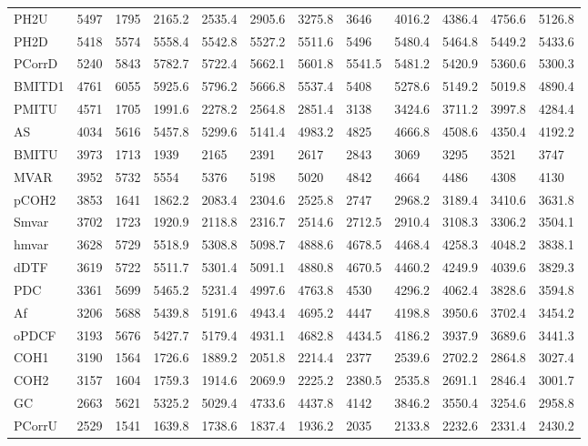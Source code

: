 \begin{table}[ht]
\begin{tabular}{llllllllllll}
  PH2U & 5497 & 1795 & 2165.2 & 2535.4 & 2905.6 & 3275.8 & 3646 & 4016.2 & 4386.4 & 4756.6 & 5126.8 \\ 
  PH2D & 5418 & 5574 & 5558.4 & 5542.8 & 5527.2 & 5511.6 & 5496 & 5480.4 & 5464.8 & 5449.2 & 5433.6 \\ 
  PCorrD & 5240 & 5843 & 5782.7 & 5722.4 & 5662.1 & 5601.8 & 5541.5 & 5481.2 & 5420.9 & 5360.6 & 5300.3 \\ 
  BMITD1 & 4761 & 6055 & 5925.6 & 5796.2 & 5666.8 & 5537.4 & 5408 & 5278.6 & 5149.2 & 5019.8 & 4890.4 \\ 
  PMITU & 4571 & 1705 & 1991.6 & 2278.2 & 2564.8 & 2851.4 & 3138 & 3424.6 & 3711.2 & 3997.8 & 4284.4 \\ 
  AS & 4034 & 5616 & 5457.8 & 5299.6 & 5141.4 & 4983.2 & 4825 & 4666.8 & 4508.6 & 4350.4 & 4192.2 \\ 
  BMITU & 3973 & 1713 & 1939 & 2165 & 2391 & 2617 & 2843 & 3069 & 3295 & 3521 & 3747 \\ 
  MVAR & 3952 & 5732 & 5554 & 5376 & 5198 & 5020 & 4842 & 4664 & 4486 & 4308 & 4130 \\ 
  pCOH2 & 3853 & 1641 & 1862.2 & 2083.4 & 2304.6 & 2525.8 & 2747 & 2968.2 & 3189.4 & 3410.6 & 3631.8 \\ 
  Smvar & 3702 & 1723 & 1920.9 & 2118.8 & 2316.7 & 2514.6 & 2712.5 & 2910.4 & 3108.3 & 3306.2 & 3504.1 \\ 
  hmvar & 3628 & 5729 & 5518.9 & 5308.8 & 5098.7 & 4888.6 & 4678.5 & 4468.4 & 4258.3 & 4048.2 & 3838.1 \\ 
  dDTF & 3619 & 5722 & 5511.7 & 5301.4 & 5091.1 & 4880.8 & 4670.5 & 4460.2 & 4249.9 & 4039.6 & 3829.3 \\ 
  PDC & 3361 & 5699 & 5465.2 & 5231.4 & 4997.6 & 4763.8 & 4530 & 4296.2 & 4062.4 & 3828.6 & 3594.8 \\ 
  Af & 3206 & 5688 & 5439.8 & 5191.6 & 4943.4 & 4695.2 & 4447 & 4198.8 & 3950.6 & 3702.4 & 3454.2 \\ 
  oPDCF & 3193 & 5676 & 5427.7 & 5179.4 & 4931.1 & 4682.8 & 4434.5 & 4186.2 & 3937.9 & 3689.6 & 3441.3 \\ 
  COH1 & 3190 & 1564 & 1726.6 & 1889.2 & 2051.8 & 2214.4 & 2377 & 2539.6 & 2702.2 & 2864.8 & 3027.4 \\ 
  COH2 & 3157 & 1604 & 1759.3 & 1914.6 & 2069.9 & 2225.2 & 2380.5 & 2535.8 & 2691.1 & 2846.4 & 3001.7 \\ 
  GC & 2663 & 5621 & 5325.2 & 5029.4 & 4733.6 & 4437.8 & 4142 & 3846.2 & 3550.4 & 3254.6 & 2958.8 \\ 
  PCorrU & 2529 & 1541 & 1639.8 & 1738.6 & 1837.4 & 1936.2 & 2035 & 2133.8 & 2232.6 & 2331.4 & 2430.2 \\ 

\end{tabular}
\end{table}
